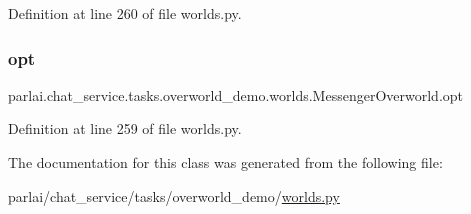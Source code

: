 Definition at line 260 of file worlds.\+py.

\mbox{\label{classparlai_1_1chat__service_1_1tasks_1_1overworld__demo_1_1worlds_1_1MessengerOverworld_a56ded4b12c29ec7afe535fa465e2f060}} 
\subsubsection{\texorpdfstring{opt}{opt}}
{\footnotesize\ttfamily parlai.\+chat\+\_\+service.\+tasks.\+overworld\+\_\+demo.\+worlds.\+Messenger\+Overworld.\+opt}



Definition at line 259 of file worlds.\+py.



The documentation for this class was generated from the following file\+:\begin{DoxyCompactItemize}
\item 
parlai/chat\+\_\+service/tasks/overworld\+\_\+demo/\hyperlink{parlai_2chat__service_2tasks_2overworld__demo_2worlds_8py}{worlds.\+py}\end{DoxyCompactItemize}
